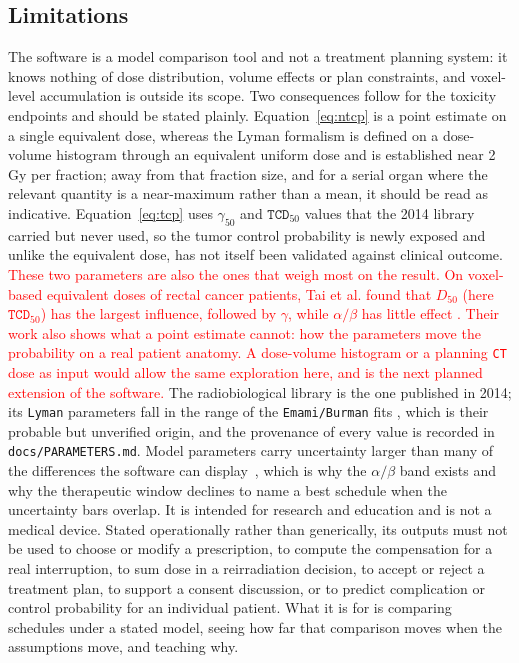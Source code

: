 \documentclass[preprint,12pt,number]{elsarticle}
\newcommand{\cyr}[1]{\textcolor{red}{#1}}
\begin{document}
\subsection{Limitations}\label{sec:limitations}
The software is a model comparison tool and not a treatment planning system: it knows nothing of dose distribution, volume effects or plan constraints, and
voxel-level accumulation \cite{singh2018,calvo2026} is outside its scope. Two consequences follow for the toxicity endpoints and should be stated plainly.
Equation~\eqref{eq:ntcp} is a point estimate on a single equivalent dose, whereas the Lyman formalism is defined on a dose-volume histogram through an equivalent uniform dose \cite{niemierko1997} and is established near 2\,Gy per fraction; away from that fraction size, and for a serial organ where the relevant quantity is a near-maximum rather than a mean, it should be read as indicative. Equation~\eqref{eq:tcp} uses $\gamma_{50}$ and $\texttt{TCD}_{50}$ values that the 2014 library carried but never used, so the tumor control probability is newly exposed and unlike the equivalent dose, has not itself been validated against clinical outcome. \cyr{These two parameters are also the ones that weigh most on the result. On voxel-based equivalent doses of rectal cancer patients, Tai et al. found that $D_{50}$ (here $\texttt{TCD}_{50}$) has the largest influence, followed by $\gamma$, while $\alpha/\beta$ has little effect \cite{tai2025}. Their work also shows what a point estimate cannot: how the parameters move the probability on a real patient anatomy. A dose-volume histogram or a planning \texttt{CT} dose as input would allow the same exploration here, and is the next planned extension of the software.} The radiobiological library is the one published in 2014; its \texttt{Lyman} parameters fall in the range of the \texttt{Emami/Burman} fits \cite{emami1991,burman1991}, which is their probable but unverified origin, and the provenance of every value is recorded in \texttt{docs/PARAMETERS.md}. Model parameters carry uncertainty larger than many of the differences the software can display\cyr{~\cite{tai2025}}, which is why the $\alpha/\beta$ band exists and why the therapeutic window declines to name a best schedule when the uncertainty bars overlap. It is intended for research and education and is not a medical device. Stated operationally rather than generically, its outputs must not be used to choose or modify a prescription, to compute the compensation for a real interruption, to sum dose in a reirradiation decision, to accept or reject a treatment plan, to support a consent discussion, or to predict complication or control probability for an individual patient. What it is for is comparing schedules under a stated model, seeing how far that comparison moves when the assumptions move, and teaching why.
\end{document}
